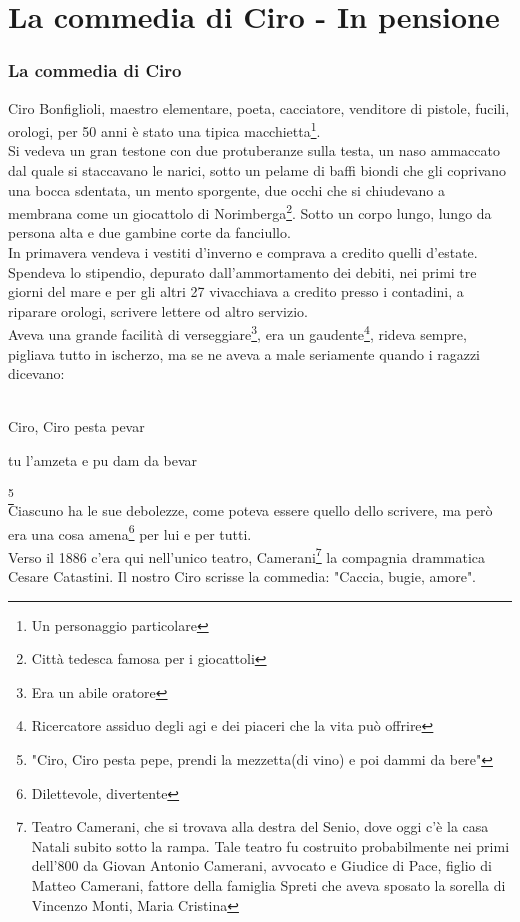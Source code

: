 
\chapter{La commedia di Ciro - In pensione}
\subsection{La commedia di Ciro}
Ciro Bonfiglioli, maestro elementare, poeta, cacciatore, venditore di pistole, fucili, orologi, per 50 anni è stato una tipica macchietta\footnote{Un personaggio particolare}.\\
Si vedeva un gran testone con due protuberanze sulla testa, un naso ammaccato dal quale si staccavano le narici, sotto un pelame di baffi biondi che gli coprivano una bocca sdentata, un mento sporgente, due occhi che si chiudevano a membrana come un giocattolo di Norimberga\footnote{Città tedesca famosa per i giocattoli}. Sotto un corpo lungo, lungo da persona alta e due gambine corte da fanciullo.
\\In primavera vendeva i vestiti d'inverno e comprava a credito quelli d'estate. Spendeva lo stipendio, depurato dall'ammortamento dei debiti, nei primi tre giorni del mare e per gli altri 27 vivacchiava a credito presso i contadini, a riparare orologi, scrivere lettere od altro servizio. \\
Aveva una grande facilità di verseggiare\footnote{Era un abile oratore}, era un gaudente\footnote{Ricercatore assiduo degli agi e dei piaceri che la vita può offrire}, rideva sempre, pigliava tutto in ischerzo, ma se ne aveva a male seriamente quando i ragazzi dicevano: \\\\
\textcal \Huge
	\centerline{Ciro, Ciro pesta pevar}
	\centerline{tu l'amzeta e pu dam da bevar}\footnote{"Ciro, Ciro pesta pepe, prendi la mezzetta(di vino) e poi dammi da bere"}
\normalfont \normalsize
{}\\
Ciascuno ha le sue debolezze, come poteva essere quello dello scrivere, ma però era una cosa amena\footnote{Dilettevole, divertente} per lui e per tutti. \\
Verso il 1886 c'era qui nell'unico teatro, Camerani\footnote{Teatro Camerani, che si trovava alla destra del Senio, dove oggi c'è la casa Natali subito sotto la rampa. Tale teatro fu costruito probabilmente nei primi dell'800 da Giovan Antonio Camerani, avvocato e Giudice di Pace, figlio di Matteo Camerani, fattore della famiglia Spreti che aveva sposato la sorella di Vincenzo Monti, Maria Cristina} la compagnia drammatica Cesare Catastini. Il nostro Ciro scrisse la commedia: "Caccia, bugie, amore". 
